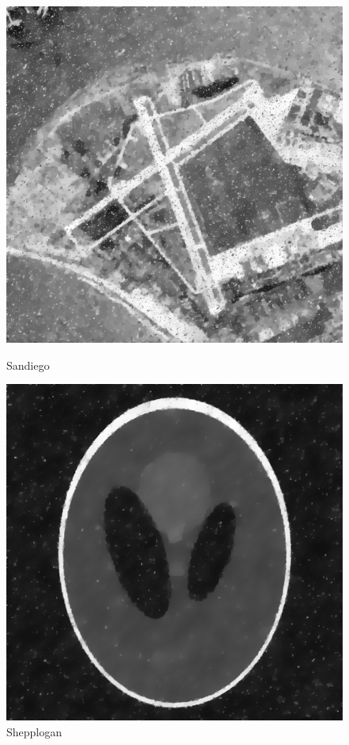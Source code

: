 \documentclass{article}
\begin{document}
    \phantom{}
    
    \begin{figure}[!htb]
      \includegraphics[scale=.45]{./edge_preserving_smoothing/sandiego/sp.png}
      \caption{Sandiego}
    \endminipage \hfill
      \includegraphics[scale=.45]{./edge_preserving_smoothing/shepplogan/sp.png}
      \caption{Shepplogan}
    \endminipage
    \end{figure}
    
\end{document}
